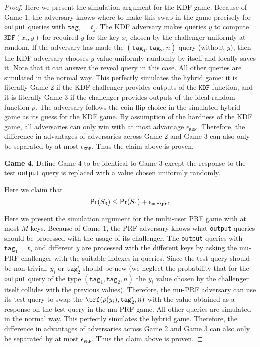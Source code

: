 \documentclass{article}
\begin{document}
{\begin{proof}
Here we present the simulation argument for the KDF game. Because of Game 1, the adversary knows where to make this swap in the game precisely for \texttt{output} queries with  $\texttt{tag}_1 =t_j$. The KDF adversary makes queries $y$ to compute $\texttt{KDF}(x_i,y)$ for required $y$ for the key $x_i$ chosen by the challenger uniformly at random.  If the adversary has made the $(\texttt{tag}_1,\texttt{tag}_2,n)$ query (without $y$), then the KDF adversary chooses $y$ value uniformly randomly by itself and locally saves it. Note that it can answer the reveal query in this case. All other queries are simulated in the normal way. This perfectly simulates the hybrid game: it is literally Game 2 if the KDF challenger provides outputs of the $\texttt{KDF}$ function, and it is literally Game 3 if the challenger provides outputs of the ideal random function $\rho$. The adversary follows the coin flip choice in the simulated hybrid game as its guess for the KDF game. By assumption of the hardness of the KDF game, all adversaries can only win with at most advantage $\epsilon_{\texttt{KDF}}$. Therefore, the difference in advantages of adversaries across Game 2 and Game 3 can also only be separated by at most $\epsilon_{\texttt{KDF}}$. Thus the claim above is proven.

\noindent \textbf{Game 4.} Define Game 4 to be identical to Game 3 except the response to the test \texttt{output} query is replaced with a value chosen uniformly randomly.

Here we claim that
$$
\Pr(S_3) \le \Pr(S_4) + \epsilon_{\texttt{mu-}\prf}
$$

Here we present the simulation argument for the multi-user PRF game with at most $M$ keys.  Because of Game 1, the PRF adversary knows what \texttt{output} queries should be processed with the usage of its challenger. The \texttt{output} queries with $\texttt{tag}_1 =t_j$ and different $y$ are processed with the different keys by asking the mu-PRF challenger with the suitable indexes in queries. Since the test query should be non-trivial, $y_i$ or $\texttt{tag}_2^i$ should be new (we neglect the probability that for the \texttt{output} query of the type $(\texttt{tag}_1,\texttt{tag}_2,n)$ the $y_i$ value chosen by the challenger itself collides with the previous values). Therefore, the mu-PRF adversary can use its test query to swap the $\prf(\rho(y_i), \texttt{tag}^i_2, n)$ with the value obtained as a response on the test query in the mu-PRF game. All other queries are simulated in the normal way. This perfectly simulates the hybrid game. Therefore, the difference in advantages of adversaries across Game 2 and Game 3 can also only be separated by at most $\epsilon_{\texttt{PRF}}$. Thus the claim above is proven.


\end{proof}}
\end{document}

